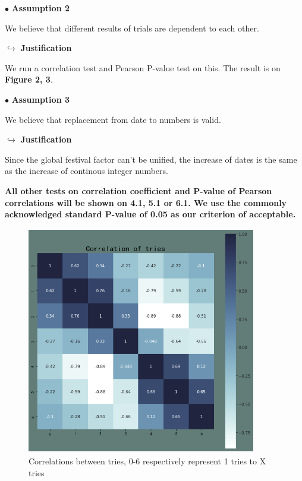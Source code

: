 \documentclass[12pt]{article}
\begin{document}
$\bullet$ \textbf{Assumption 2} 

We believe that different results of trials are dependent to each other.

$\hookrightarrow$ \textbf{Justification} 

We run a correlation test and Pearson P-value test on this. The result is on \textbf{Figure 2, 3}.

$\bullet$ \textbf{Assumption 3}

We believe that replacement from date to numbers is valid.

$\hookrightarrow$ \textbf{Justification} 

Since the global festival factor can't be unified, the increase of dates is the same as the increase of continous integer numbers.

\textbf{All other tests on correlation coefficient and P-value of Pearson correlations will be shown on 4.1, 5.1 or 6.1. We use the commonly acknowledged standard P-value of 0.05 as our criterion of acceptable.}

\begin{figure}[htbp]

	\centering
	\includegraphics[height=10cm, width=10cm]{tries_cor.png}
	\caption{Correlations between tries, 0-6 respectively represent 1 tries to X tries}


\end{figure}
\end{document}
